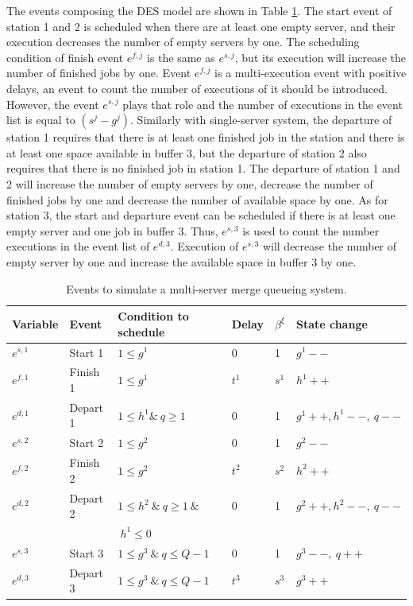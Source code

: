 \documentclass[]{interact}
\theoremstyle{plain}%
\theoremstyle{definition}
\theoremstyle{remark}
\begin{document}
The events composing the DES model are shown in Table \ref{tab:multimerge}. The start event of station 1 and 2 is scheduled when there are at least one empty server, and their execution decreases the number of empty servers by one. The scheduling condition of finish event $e^{f,j}$ is the same as $e^{s,j}$, but its execution will increase the number of finished jobs by one. Event $e^{f,j}$ is a multi-execution event with positive delays, an event to count the number of executions of it should be introduced. However, the event $e^{s,j}$ plays that role and the number of executions in the event list is equal to $(s^j-g^j)$. Similarly with single-server system, the departure of station 1 requires that there is at least one finished job in the station and there is at least one space available in buffer 3, but the departure of station 2 also requires that there is no finished job in station 1. The departure of station 1 and 2 will increase the number of empty servers by one, decrease the number of finished jobs by one and decrease the number of available space by one. As for station 3, the start and departure event can be scheduled if there is at least one empty server and one job in buffer 3. Thus, $e^{s,3}$ is used to count the number executions in the event list of $e^{d,3}$. Execution of $e^{s,3}$ will decrease the number of empty server by one and increase the available space in buffer 3 by one.

\begin{table}[h]
	\begin{tabular}{|llllll|}\hline
		Variable&Event & Condition to schedule & Delay&$\beta^{\xi}$& State change\\\hline
		$e^{s,1}$&Start 1 	& $1\le g^1$ & $0$&1& $g^1--$ \\\hline
		$e^{f,1}$&Finish 1 & $1\le g^1$ 	& $t^1$ &$s^1$& $h^1++$\\\hline 
		$e^{d,1}$&Depart 1& $1\le h^1 \&\  q\ge 1$&$0$ &1 & $g^1++,h^1--,\ q--$\\\hline
		$e^{s,2}$&Start 2 	& $1\le g^2$ & $0$ &1& $g^2--$ \\	\hline
		$e^{f,2}$&Finish 2 & $1\le g^2$ 	& $t^2$ &$s^2$ & $h^2++$\\\hline
		$e^{d,2}$&Depart 2& $1\le h^2\ \&\ q\ge 1\ \&$&$0$  &1&  $g^2++,h^2--,\ q--$\\
		&&$\ h^1\le 0 $ & &&\\\hline
		$e^{s,3}$& Start 3 & $1\le g^3\ \&\ q\le Q-1$&$0$  &1& $g^3--,\ q++$\\\hline
		$e^{d,3}$& Depart 3 & $1\le g^3\ \&\ q\le Q-1$ & $t^3$  &$s^3$& $g^3++$\\\hline
	\end{tabular}
	\caption{Events to simulate a multi-server merge queueing system.}
	\label{tab:multimerge}
\end{table}
\end{document}
